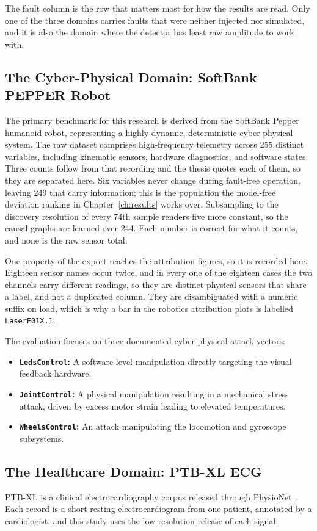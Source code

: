 The fault column is the row that matters most for how the results are read. Only one of the three domains carries faults that were neither injected nor simulated, and it is also the domain where the detector has least raw amplitude to work with.

\subsection{The Cyber-Physical Domain: SoftBank PEPPER Robot}
The primary benchmark for this research is derived from the SoftBank Pepper humanoid robot, representing a highly dynamic, deterministic cyber-physical system. The raw dataset comprises high-frequency telemetry across 255 distinct variables, including kinematic sensors, hardware diagnostics, and software states. Three counts follow from that recording and the thesis quotes each of them, so they are separated here. Six variables never change during fault-free operation, leaving 249 that carry information; this is the population the model-free deviation ranking in Chapter~\ref{ch:results} works over. Subsampling to the discovery resolution of every 74th sample renders five more constant, so the causal graphs are learned over 244. Each number is correct for what it counts, and none is the raw sensor total.

One property of the export reaches the attribution figures, so it is recorded here. Eighteen sensor names occur twice, and in every one of the eighteen cases the two channels carry different readings, so they are distinct physical sensors that share a label, and not a duplicated column. They are disambiguated with a numeric suffix on load, which is why a bar in the robotics attribution plots is labelled \texttt{LaserF01X.1}.

The evaluation focuses on three documented cyber-physical attack vectors:
\begin{itemize}
    \item \textbf{\texttt{LedsControl}:} A software-level manipulation directly targeting the visual feedback hardware.
    \item \textbf{\texttt{JointControl}:} A physical manipulation resulting in a mechanical stress attack, driven by excess motor strain leading to elevated temperatures.
    \item \textbf{\texttt{WheelsControl}:} An attack manipulating the locomotion and gyroscope subsystems.
\end{itemize}

\subsection{The Healthcare Domain: PTB-XL ECG}
PTB-XL is a clinical electrocardiography corpus released through PhysioNet~\cite{wagner2020ptbxl,goldberger2000physionet}. Each record is a short resting electrocardiogram from one patient, annotated by a cardiologist, and this study uses the low-resolution release of each signal.

